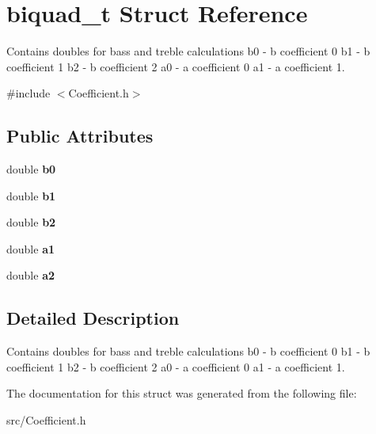 \hypertarget{structbiquad__t}{}\section{biquad\+\_\+t Struct Reference}
\label{structbiquad__t}


Contains doubles for bass and treble calculations b0 -\/ b coefficient 0 b1 -\/ b coefficient 1 b2 -\/ b coefficient 2 a0 -\/ a coefficient 0 a1 -\/ a coefficient 1.  




{\ttfamily \#include $<$Coefficient.\+h$>$}

\subsection*{Public Attributes}
\begin{DoxyCompactItemize}
\item 
\hypertarget{structbiquad__t_a1ce93a5333970082203532c9ffdf5828}{}double {\bfseries b0}\label{structbiquad__t_a1ce93a5333970082203532c9ffdf5828}

\item 
\hypertarget{structbiquad__t_a3f8e82acc26d35a1563b4bbead340141}{}double {\bfseries b1}\label{structbiquad__t_a3f8e82acc26d35a1563b4bbead340141}

\item 
\hypertarget{structbiquad__t_aeb9211d4485eca4e49caceb95e168fb2}{}double {\bfseries b2}\label{structbiquad__t_aeb9211d4485eca4e49caceb95e168fb2}

\item 
\hypertarget{structbiquad__t_a9ce3c9940d0f31b183705881e06c6382}{}double {\bfseries a1}\label{structbiquad__t_a9ce3c9940d0f31b183705881e06c6382}

\item 
\hypertarget{structbiquad__t_a1cf4a4cf8a065f8eea2f5e1699946cb4}{}double {\bfseries a2}\label{structbiquad__t_a1cf4a4cf8a065f8eea2f5e1699946cb4}

\end{DoxyCompactItemize}


\subsection{Detailed Description}
Contains doubles for bass and treble calculations b0 -\/ b coefficient 0 b1 -\/ b coefficient 1 b2 -\/ b coefficient 2 a0 -\/ a coefficient 0 a1 -\/ a coefficient 1. 

The documentation for this struct was generated from the following file\+:\begin{DoxyCompactItemize}
\item 
src/Coefficient.\+h\end{DoxyCompactItemize}
